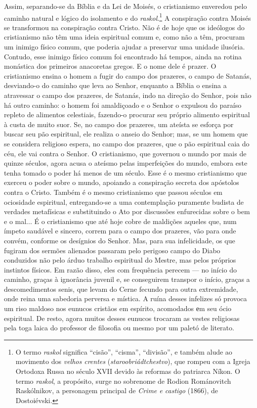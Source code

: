 Assim, separando-se da Bíblia e da Lei de Moisés, o cristianismo
enveredou pelo caminho natural e lógico do isolamento e do
\emph{raskol}.\footnote{O termo \emph{raskol} significa ``cisão'',
  ``cisma'', ``divisão'', e também alude ao movimento dos \emph{velhos
  crentes} (\emph{staroobriádtchestvo}), que rompeu com a Igreja
  Ortodoxa Russa no século XVII devido às reformas do patriarca Níkon. O
  termo \emph{raskol}, a propósito, surge no sobrenome de Rodion
  Románovitch Raskólnikov, a personagem principal de \emph{Crime e
  castigo} (1866), de Dostoiévski.} A conspiração contra Moisés se
transformou na conspiração contra Cristo. Não é de hoje que os ideólogos
do cristianismo não têm uma ideia espiritual comum e, como não a têm,
procuram um inimigo físico comum, que poderia ajudar a preservar uma
unidade ilusória. Contudo, esse inimigo físico comum foi encontrado há
tempos, ainda na rotina monástica dos primeiros anacoretas gregos. E o
nome dele é prazer. O cristianismo ensina o homem a fugir do campo dos
prazeres, o campo de Satanás, desviando-o do caminho que leva ao Senhor,
enquanto a Bíblia o ensina a atravessar o campo dos prazeres, de
Satanás, indo na direção do Senhor, pois não há outro caminho: o homem
foi amaldiçoado e o Senhor o expulsou do paraíso repleto de alimentos
celestiais, fazendo-o procurar seu próprio alimento espiritual à custa
de muito suor. Se, no campo dos prazeres, um ateísta se esforça por
buscar seu pão espiritual, ele realiza o anseio do Senhor; mas, se um
homem que se considera religioso espera, no campo dos prazeres, que o
pão espiritual caia do céu, ele vai contra o Senhor. O cristianismo, que
governou o mundo por mais de quinze séculos, agora acusa o ateísmo pelas
imperfeições do mundo, embora este tenha tomado o poder há menos de um
século. Esse é o mesmo cristianismo que exerceu o poder sobre o mundo,
apoiando a conspiração secreta dos apóstolos contra o Cristo. Também é o
mesmo cristianismo que passou séculos em ociosidade espiritual,
entregando-se a uma contemplação puramente budista de verdades
metafísicas e substituindo o Ato por discussões enfurecidas sobre o bem
e o mal... É o cristianismo que até hoje cobre de maldições aqueles que,
num ímpeto saudável e sincero, correm para o campo dos prazeres, vão
para onde convém, conforme os desígnios do Senhor. Mas, para sua
infelicidade, os que fugiram dos sermões alienados passaram pelo
perigoso campo do Diabo conduzidos não pelo árduo trabalho espiritual do
Mestre, mas pelos próprios instintos físicos. Em razão disso, eles com
frequência perecem --- no início do caminho, graças à ignorância juvenil
e, se conseguirem transpor o início, graças a descomedimentos senis, que
levam do Cerne fecundo para outra extremidade, onde reina uma sabedoria
perversa e mística. A ruína desses infelizes só provoca um riso maldoso
nos eunucos cristãos em espírito, acomodados еm seu ócio espiritual. De
resto, agora muitos desses eunucos trocaram as vestes religiosas pela
toga laica do professor de filosofia ou mesmo por um paletó de literato.

